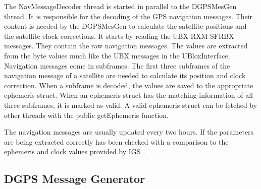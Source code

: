 The NavMessageDecoder thread is started in parallel to the DGPSMesGen thread.
It is responsible for the decoding of the GPS navigation messages.
Their content is needed by the DGPSMesGen to calculate the satellite positions and the satellite clock corrections.
It starts by reading the UBX-RXM-SFRBX messages.
They contain the raw navigation messages.
The values are extracted from the byte values much like the UBX messages in the UBloxInterface.
Navigation messages come in subframes.
The first three subframes of the navigation message of a satellite are needed to calculate its position and clock correction.
When a subframe is decoded, the values are saved to the appropriate ephemeris struct.
When an ephemeris struct has the matching information of all three subframes, it is marked as valid.
A valid ephemeris struct can be fetched by other threads with the public getEphemeris function.

The navigation messages are usually updated every two hours.
If the parameters are being extracted correctly has been checked with a comparison to the ephemeris and clock values provided by IGS \cite{IGS}.

\subsection{DGPS Message Generator}

